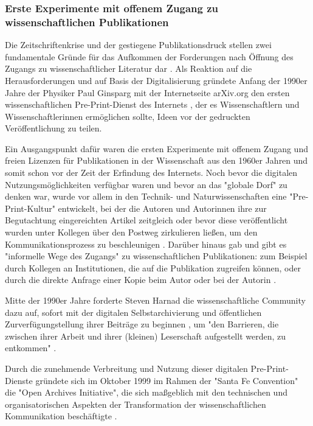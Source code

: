 \subsubsection{Erste Experimente mit offenem Zugang zu wissenschaftlichen Publikationen}

Die Zeitschriftenkrise und der gestiegene Publikationsdruck stellen zwei fundamentale Gründe für das Aufkommen der Forderungen nach Öffnung des Zugangs zu wissenschaftlicher Literatur dar \cite{Brintzinger_2010} \cite{Wein_2010}. Als Reaktion auf die Herausforderungen und auf Basis der Digitalisierung gründete Anfang der 1990er Jahre der Physiker Paul Ginsparg mit der Internetseite arXiv.org den ersten wissenschaftlichen Pre-Print-Dienst des Internets \cite{Willinsky_2006} \cite{Bjoerk_2004}, der es Wissenschaftlern und Wissenschaftlerinnen ermöglichen sollte, Ideen vor der gedruckten Veröffentlichung zu teilen.

Ein Ausgangspunkt dafür waren die ersten Experimente mit offenem Zugang und freien Lizenzen für Publikationen in der Wissenschaft aus den 1960er Jahren und somit schon vor der Zeit der Erfindung des Internets. Noch bevor die digitalen Nutzungsmöglichkeiten verfügbar waren und bevor an das "globale Dorf" \cite{McLuhan_1962} zu denken war, wurde vor allem in den Technik- und Naturwissenschaften eine "Pre-Print-Kultur" entwickelt, bei der die Autoren und Autorinnen ihre zur Begutachtung eingereichten Artikel zeitgleich oder bevor diese veröffentlicht wurden unter Kollegen über den Postweg zirkulieren ließen, um den Kommunikationsprozess zu beschleunigen \cite[:6]{Hofmann_2016}. Darüber hinaus gab und gibt es "informelle Wege des Zugangs" zu wissenschaftlichen Publikationen: zum Beispiel durch Kollegen an Institutionen, die auf die Publikation zugreifen können, oder durch die direkte Anfrage einer Kopie beim Autor oder bei der Autorin \cite{Davis_2011}.

Mitte der 1990er Jahre forderte Steven Harnad die wissenschaftliche Community dazu auf, sofort mit der digitalen Selbstarchivierung und öffentlichen Zurverfügungstellung ihrer Beiträge zu beginnen \cite{Albert_2006}, um "den Barrieren, die zwischen ihrer Arbeit und ihrer (kleinen) Leserschaft aufgestellt werden, zu entkommen" \cite{Harnad_1995}.

Durch die zunehmende Verbreitung und Nutzung dieser digitalen Pre-Print-Dienste gründete sich im Oktober 1999 im Rahmen der "Santa Fe Convention" die "Open Archives Initiative", die sich maßgeblich mit den technischen und organisatorischen Aspekten der Transformation der wissenschaftlichen Kommunikation beschäftigte \cite{van_de_Sompel_2000}.

